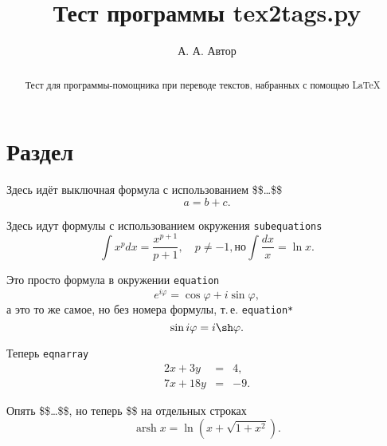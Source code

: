 \documentclass[12pt]{article}
\DeclareMathOperator{\arsh}{arsh}
\begin{document}
\title{\bf Тест программы tex2tags.py}
\author{А. А. Автор}
\date{}
{\let\newpage\relax\maketitle}
\begin{abstract}
Тест для программы\hyp{}помощника при переводе текстов, набранных с помощью
\LaTeX
\end{abstract}
\section{Раздел}
Здесь идёт выключная формула с использованием \$\$\ldots\$\$
$$a = b + c.$$

Здесь идут формулы с использованием окружения \verb+subequations+
%
\begin{subequations}\label{eq1}
\begin{equation}
    \int x^p dx = \frac{x^{p+1}}{p+1},\quad p \ne -1,
\end{equation}
%
но
%
\begin{equation}
    \int \frac{dx}{x} = \ln x.
\end{equation}
\end{subequations}

Это просто формула в окружении \verb+equation+
%
\begin {equation}\label{eq2}
    e^{i\varphi} = \cos\varphi + i\sin\varphi,
\end {equation}
%
а это то же самое, но без номера формулы, т.\,е. \verb+equation*+
%
\begin{equation*}
    \sin i\varphi = i\sh\varphi.
\end{equation*}

Теперь \verb+eqnarray+
%
\begin{eqnarray}
    2x + 3y &=& 4, \\
    7x + 18y &=& -9.
\end{eqnarray}

Опять \$\$\ldots\$\$, но теперь \$\$ на отдельных строках
$$
    \arsh x = \ln(x + \sqrt{1 + x^2}).
$$
\end{document}
